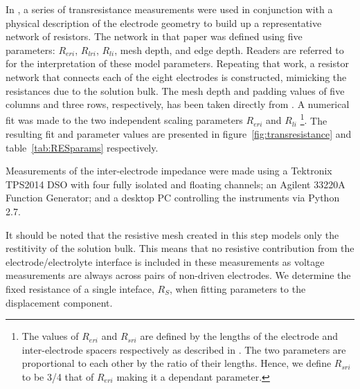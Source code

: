 \documentclass[journal, a4paper]{IEEEtran}
\begin{document}
In \cite{ScottSingle2013}, a series of transresistance measurements were used in conjunction with a physical description of the electrode geometry to build up a representative network of resistors. The network in that paper was defined using five parameters: $R_{eri}$, $R_{lri}$, $R_{li}$, mesh depth, and edge depth. Readers are referred to \cite{ScottSingle2013} for the interpretation of these model parameters. Repeating that work, a resistor network that connects each of the eight electrodes is constructed, mimicking the resistances due to the solution bulk.
{
    \color{blue}
The mesh depth and padding values of five columns and three rows, respectively, has been taken directly from \cite{ScottSingle2013}.
A numerical fit was made to the two independent scaling parameters $R_{eri}$ and $R_{li}$
\footnote{The values of $R_{eri}$ and $R_{sri}$ are defined by the lengths of the electrode and inter-electrode spacers respectively as described in \cite{ScottSingle2013}. The two parameters are proportional to each other by the ratio of their lengths. Hence, we define $R_{sri}$ to be 3/4 that of $R_{eri}$ making it a dependant parameter.}.
}
The resulting fit and parameter values are presented in figure~\ref{fig:transresistance} and table~\ref{tab:RESparams} respectively.
{
    \color{blue}
Measurements of the inter-electrode impedance were made using a Tektronix TPS2014 DSO with four fully isolated and floating channels; an Agilent 33220A Function Generator; and a desktop PC controlling the instruments via Python 2.7.


It should be noted that the resistive mesh created in this step models only the restitivity of the solution bulk. This means that no resistive contribution from the electrode/electrolyte interface is included in these measurements as voltage measurements are always across pairs of non-driven electrodes. We determine the fixed resistance of a single inteface, $R_{S}$, when fitting parameters to the displacement component.
}
\end{document}
